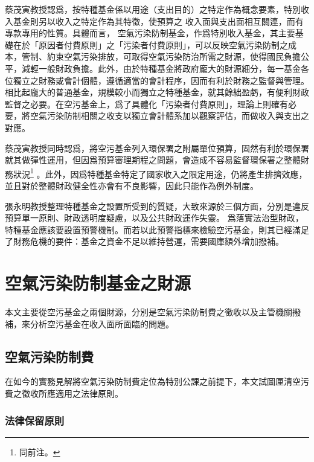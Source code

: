 \documentclass[12pt,a4paper]{article}
\begin{document}
蔡茂寅教授認爲，按特種基金係以用途（支出目的）之特定作為概念要素，特別收入基金則另以收入之特定作為其特徵，使預算之 收入面與支出面相互關連，而有專款專用的性質。具體而言，
空氣污染防制基金，作爲特別收入基金，其主要基礎在於「原因者付費原則」之「污染者付費原則」，可以反映空氣污染防制之成本，管制、約束空氣污染排放，可取得空氣污染防治所需之財源，使得國民負擔公平，減輕一般財政負擔。此外，由於特種基金將政府龐大的財源細分，每一基金各位獨立之財務或會計個體，遵循適當的會計程序，因而有利於財務之監督與管理。相比起龐大的普通基金，規模較小而獨立之特種基金，就其餘絀盈虧，有便利財政監督之必要。在空污基金上，爲了具體化「污染者付費原則」，理論上則確有必要，將空氣污染防制相關之收支以獨立會計體系加以觀察評估，而做收入與支出之對應。

蔡茂寅教授同時認爲，將空污基金列入環保署之附屬單位預算，固然有利於環保署就其做彈性運用，但因爲預算審理期程之問題，會造成不容易監督環保署之整體財務狀況\footnote{同前注。}
。此外，因爲特種基金特定了國家收入之限定用途，仍將產生排擠效應，並且對於整體財政健全性亦會有不良影響，因此只能作為例外制度。


張永明教授整理特種基金之設置所受到的質疑，大致來源於三個方面，分別是違反預算單一原則、財政透明度疑慮，以及公共財政運作失靈。
爲落實法治型財政，特種基金應該要設置預警機制。而若以此預警指標來檢驗空污基金，則其已經滿足了財務危機的要件：基金之資金不足以維持營運，需要國庫額外增加撥補。


\pagebreak

\section{空氣污染防制基金之財源}

本文主要從空污基金之兩個財源，分別是空氣污染防制費之徵收以及主管機關撥補，來分析空污基金在收入面所面臨的問題。

\subsection{空氣污染防制費}

在如今的實務見解將空氣污染防制費定位為特別公課之前提下，本文試圖厘清空污費之徵收所應適用之法律原則。

\subsubsection{法律保留原則}
\end{document}
